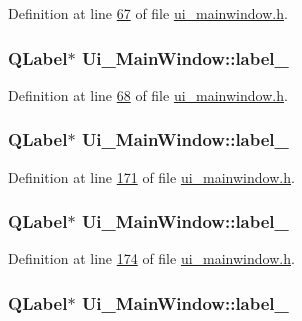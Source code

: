 Definition at line \hyperlink{a00052_source_l00067}{67} of file \hyperlink{a00052_source}{ui\+\_\+mainwindow.\+h}.

\hypertarget{a00027_a2e2516d755e4dd53fc905dabddf2738a}{
\subsubsection[{label\+\_\+2}]{\setlength{\rightskip}{0pt plus 5cm}Q\+Label$\ast$ Ui\+\_\+\+Main\+Window\+::label\+\_}}\label{a00027_a2e2516d755e4dd53fc905dabddf2738a}


Definition at line \hyperlink{a00052_source_l00068}{68} of file \hyperlink{a00052_source}{ui\+\_\+mainwindow.\+h}.

\hypertarget{a00027_a0376fd90247280e7c7957cc70628708c}{
\subsubsection[{label\+\_\+3}]{\setlength{\rightskip}{0pt plus 5cm}Q\+Label$\ast$ Ui\+\_\+\+Main\+Window\+::label\+\_}}\label{a00027_a0376fd90247280e7c7957cc70628708c}


Definition at line \hyperlink{a00052_source_l00171}{171} of file \hyperlink{a00052_source}{ui\+\_\+mainwindow.\+h}.

\hypertarget{a00027_a78c7e10730b43c6700cd7216911ed76a}{
\subsubsection[{label\+\_\+4}]{\setlength{\rightskip}{0pt plus 5cm}Q\+Label$\ast$ Ui\+\_\+\+Main\+Window\+::label\+\_}}\label{a00027_a78c7e10730b43c6700cd7216911ed76a}


Definition at line \hyperlink{a00052_source_l00174}{174} of file \hyperlink{a00052_source}{ui\+\_\+mainwindow.\+h}.

\hypertarget{a00027_ad6bab8fb8903b8f41afea1218ee52695}{
\subsubsection[{label\+\_\+5}]{\setlength{\rightskip}{0pt plus 5cm}Q\+Label$\ast$ Ui\+\_\+\+Main\+Window\+::label\+\_}}\label{a00027_ad6bab8fb8903b8f41afea1218ee52695}


